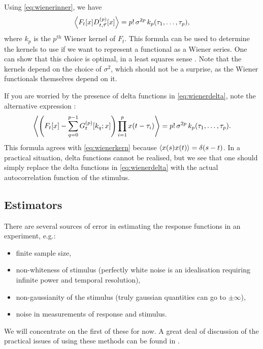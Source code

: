 \documentclass[12pt]{article}
\theoremstyle{slplain}
\theoremstyle{sldefinition}
\theoremstyle{remark}
\begin{document}
Using \eqref{eq:wienerinner}, we have
%
\begin{equation}\label{eq:wienerkern}
  \left\langle F_t[x] D^{(p)}_{t,\vec{\tau}}[x] \right\rangle = p!\,\sigma^{2p}\,k_p(\tau_1,\ldots,\tau_p),
\end{equation}
%
where $k_p$ is the $p^{\text{th}}$ Wiener kernel of $F_t$. This formula can be used to determine the kernels to use if we want to represent a functional as a Wiener series. One can show that this choice is optimal, in a least squares sense \cite[\S15.2]{schetzen:1980}. Note that the kernels depend on the choice of $\sigma^2$, which should not be a surprise, as the Wiener functionals themselves depend on it.

If you are worried by the presence of delta functions in \eqref{eq:wienerdelta}, note the alternative expression \cite{Lee1965}:
%
\begin{equation}\label{eq:wieneralt}
  \left\langle \left (  F_t[x] - \sum_{q=0}^{p-1} G_t^{(p)}[k_q;x] \right ) \prod_{i=1}^p x(t-\tau_i)  \right\rangle = p!\,\sigma^{2p}\,k_p(\tau_1,\ldots,\tau_p).
\end{equation}
%
This formula agrees with \eqref{eq:wienerkern} because $\left\langle x(s)x(t) \right\rangle=\delta(s-t)$. In a practical situation, delta functions cannot be realised, but we see that one should simply replace the delta functions in \eqref{eq:wienerdelta} with the actual autocorrelation function of the stimulus.

\subsection{Estimators}\label{sec:wienerest}

There are several sources of error in estimating the response functions in an experiment, e.g.:
\begin{itemize}
  \item finite sample size,
  \item non-whiteness of stimulus (perfectly white noise is an idealisation requiring infinite power and temporal resolution),
  \item non-gaussianity of the stimulus (truly gaussian quantities can go to $\pm\infty$),
  \item noise in measurements of response and stimulus.
\end{itemize}
We will concentrate on the first of these for now. A great deal of discussion of the practical issues of using these methods can be found in \cite{Marmerelis:1978}.
\end{document}
